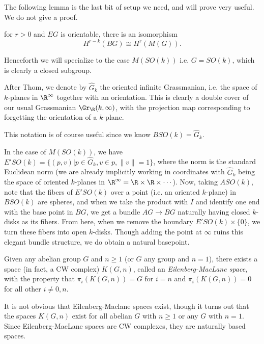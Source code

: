The following lemma is the last bit of setup we need, and will prove very useful. We do not give a proof.

\begin{lemma}
    for $r>0$ and $EG$ is orientable, there is an isomorphism
    \[H^{r-k}(BG)\cong H^r(M(G)).\]
\end{lemma}

Henceforth we will specialize to the case $M(SO(k))$ i.e. $G=SO(k)$, which is clearly a closed subgroup.

\begin{notation}
    After Thom, we denote by $\widehat G_k$ the oriented infinite Grassmanian, i.e. the space of $k$-planes in $\R^\infty$ together with an orientation. This is clearly a double cover of our usual Grassmanian $\Gr_\R(k,\infty)$, with the projection map corresponding to forgetting the orientation of a $k$-plane.
\end{notation}
This notation is of course useful since we know $BSO(k)=\widehat G_k$.

In the case of $M(SO(k))$, we have $E'SO(k)=\{(p,v)|p\in \widehat G_k, v\in p, \|v\|=1\}$, where the norm is the standard Euclidean norm (we are already implicitly working in coordinates with $\widehat G_k$ being the space of oriented $k$-planes in $\R^\infty=\R\times\R\times\cdots$). Now, taking $ASO(k)$, note that the fibers of $E'SO(k)$ over a point (i.e. an oriented $k$-plane) in $BSO(k)$ are spheres, and when we take the product with $I$ and identify one end with the base point in $BG$, we get a bundle $AG\to BG$ naturally having closed $k$-disks as its fibers. From here, when we remove the boundary $E'SO(k)\times \{0\}$, we turn these fibers into open $k$-disks. Though adding the point at $\infty$ ruins this elegant bundle structure, we do obtain a natural basepoint.

\begin{definition}
    Given any abelian group $G$ and $n\geq 1$ (or $G$ any group and $n=1$), there exists a space (in fact, a CW complex) $K(G,n)$, called an \textit{Eilenberg-MacLane space}, with the property that $\pi_i(K(G,n))=G$ for $i=n$ and $\pi_i(K(G,n))=0$ for all other $i\neq 0,n$.
\end{definition}

It is not obvious that Eilenberg-Maclane spaces exist, though it turns out that the spaces $K(G,n)$ exist for all abelian $G$ with $n\geq 1$ or any $G$ with $n=1$. Since Eilenberg-MacLane spaces are CW complexes, they are naturally based spaces.




